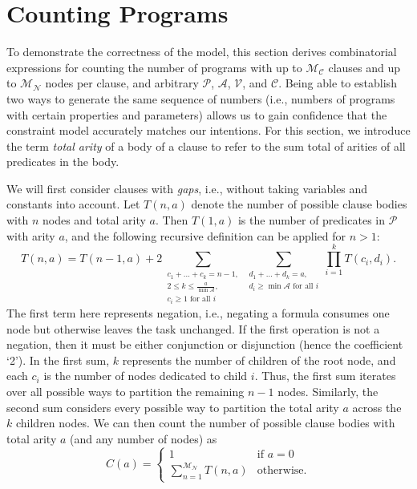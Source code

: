 \documentclass[runningheads]{llncs}
\newcommand{\predicates}{\mathcal{P}}
\newcommand{\variables}{\mathcal{V}}
\newcommand{\constants}{\mathcal{C}}
\newcommand{\arities}{\mathcal{A}}
\newcommand{\maxNumNodes}{\mathcal{M}_{\mathcal{N}}}
\newcommand{\maxNumClauses}{\mathcal{M}_{\mathcal{C}}}
\begin{document}
\section{Counting Programs} \label{sec:counting}

To demonstrate the correctness of the model, this section derives combinatorial
expressions for counting the number of programs with up to $\maxNumClauses{}$
clauses and up to $\maxNumNodes{}$ nodes per clause, and arbitrary
$\predicates{}$, $\arities{}$, $\variables{}$, and $\constants{}$. Being able to
establish two ways to generate the same sequence of numbers (i.e., numbers of
programs with certain properties and parameters) allows us to gain confidence
that the constraint model accurately matches our intentions. For this section,
we introduce the term \emph{total arity} of a body of a clause to refer to the
sum total of arities of all predicates in the body.

We will first consider clauses with \emph{gaps}, i.e., without taking variables
and constants into account. Let $T(n, a)$ denote the number of possible clause
bodies with $n$ nodes and total arity $a$. Then $T(1, a)$ is the number of
predicates in $\predicates{}$ with arity $a$, and the following recursive
definition can be applied for $n > 1$:
\[
  T(n, a) = T(n-1, a) + 2\sum_{\substack{c_1 + \dots + c_k = n - 1,\\ 2 \le k
      \le \frac{a}{\min \arities{}},\\ c_i \ge 1 \text{ for all } i}}
  \sum_{\substack{d_1 + \dots + d_k = a,\\ d_i \ge \min \arities{} \text{ for
        all } i}} \prod_{i=1}^k T(c_i, d_i).
\]
The first term here represents negation, i.e., negating a formula consumes
one node but otherwise leaves the task unchanged. If the first operation is not
a negation, then it must be either conjunction or disjunction (hence the
coefficient `2'). In the first sum, $k$ represents the number of children of the
root node, and each $c_i$ is the number of nodes dedicated to child $i$. Thus,
the first sum iterates over all possible ways to partition the remaining $n-1$
nodes. Similarly, the second sum considers every possible way to partition the
total arity $a$ across the $k$ children nodes. We can then count the number of
possible clause bodies with total arity $a$ (and any number of nodes) as
\[
  C(a) = \begin{cases}
    1 & \text{if } a = 0\\
    \sum_{n=1}^{\maxNumNodes{}} T(n, a) & \text{otherwise.}
  \end{cases}
\]
\end{document}
